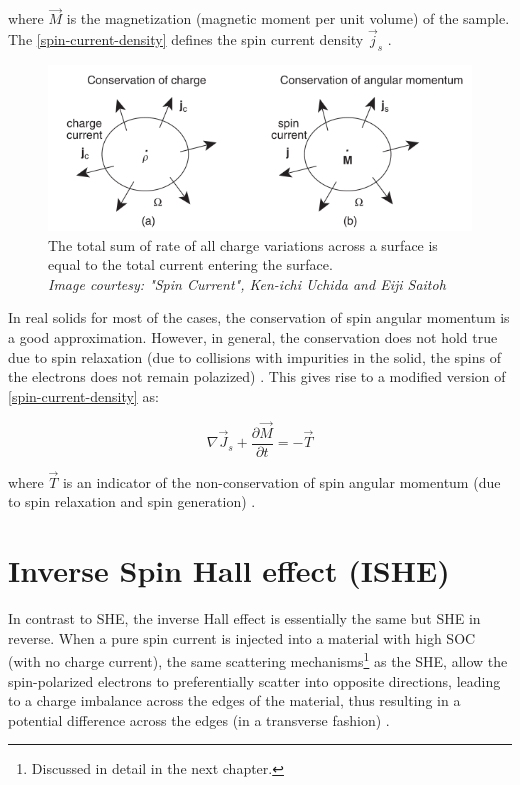 where $ \vec{M} $ is the magnetization (magnetic moment per unit volume) of the sample. The \cref{spin-current-density} defines the spin current density $ \vec{j}_s $ \cite{Uchida_2016}.

\begin{figure}[h!]
    \centering
    \includegraphics[scale=0.6]{spin-current.png}
    \caption{The total sum of rate of all charge variations across a surface is equal to the total current entering the surface.\\ \vspace{0.2cm} \textit{Image courtesy: "Spin Current", Ken-ichi Uchida and Eiji Saitoh}}
\end{figure}


In real solids for most of the cases, the conservation of spin angular momentum is a good approximation. However, in general, the conservation does not hold true due to spin relaxation (due to collisions with impurities in the solid, the spins of the electrons does not remain polazized) \cite{Uchida_2016}. This gives rise to a modified version of \cref{spin-current-density} as:

\begin{equation}
    \nabla \vec{J}_s + \frac{\partial \vec{M}}{\partial t} = -\vec{T}
\end{equation}

where $ \vec{T} $ is an indicator of the non-conservation of spin angular momentum (due to spin relaxation and spin generation) \cite{Uchida_2016}.

\section{Inverse Spin Hall effect (ISHE)}

\label{sec:ishe}

In contrast to SHE, the inverse Hall effect is essentially the same but SHE in reverse.
When a pure spin current is injected into a material with high SOC (with no charge current), the same scattering mechanisms\footnote{Discussed in detail in the next chapter.} as the SHE, allow the spin-polarized electrons to preferentially scatter into opposite directions, leading to a charge imbalance across the edges of the material, thus resulting in a potential difference across the edges (in a transverse fashion) \cite{d1971possibility}.

